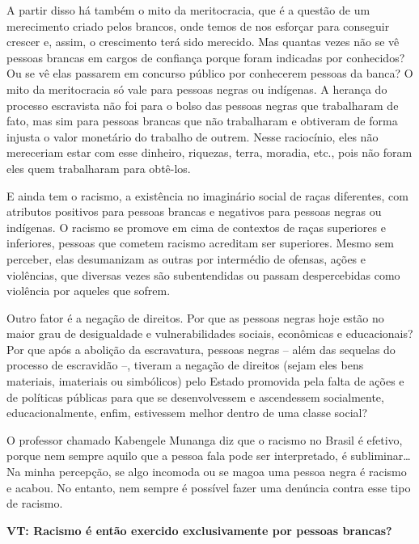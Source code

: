 \documentclass[a4paper,
fontsize=11pt,
oneside,
numbers=noperiodatend,
parskip=half-,
bibliography=totoc,
final
]{scrartcl}
\begin{document}
A partir disso há também o mito da meritocracia, que é a questão de um
merecimento criado pelos brancos, onde temos de nos esforçar para
conseguir crescer e, assim, o crescimento terá sido merecido. Mas
quantas vezes não se vê pessoas brancas em cargos de confiança porque
foram indicadas por conhecidos? Ou se vê elas passarem em concurso
público por conhecerem pessoas da banca? O mito da meritocracia só vale
para pessoas negras ou indígenas. A herança do processo escravista não
foi para o bolso das pessoas negras que trabalharam de fato, mas sim
para pessoas brancas que não trabalharam e obtiveram de forma injusta o
valor monetário do trabalho de outrem. Nesse raciocínio, eles não
mereceriam estar com esse dinheiro, riquezas, terra, moradia, etc., pois
não foram eles quem trabalharam para obtê-los.

E ainda tem o racismo, a existência no imaginário social de raças
diferentes, com atributos positivos para pessoas brancas e negativos
para pessoas negras ou indígenas. O racismo se promove em cima de
contextos de raças superiores e inferiores, pessoas que cometem racismo
acreditam ser superiores. Mesmo sem perceber, elas desumanizam as outras
por intermédio de ofensas, ações e violências, que diversas vezes são
subentendidas ou passam despercebidas como violência por aqueles que
sofrem.

Outro fator é a negação de direitos. Por que as pessoas negras hoje
estão no maior grau de desigualdade e vulnerabilidades sociais,
econômicas e educacionais? Por que após a abolição da escravatura,
pessoas negras -- além das sequelas do processo de escravidão --,
tiveram a negação de direitos (sejam eles bens materiais, imateriais ou
simbólicos) pelo Estado promovida pela falta de ações e de políticas
públicas para que se desenvolvessem e ascendessem socialmente,
educacionalmente, enfim, estivessem melhor dentro de uma classe social?

O professor chamado Kabengele Munanga diz que o racismo no Brasil é
efetivo, porque nem sempre aquilo que a pessoa fala pode ser
interpretado, é subliminar\ldots{} Na minha percepção, se algo incomoda
ou se magoa uma pessoa negra é racismo e acabou. No entanto, nem sempre
é possível fazer uma denúncia contra esse tipo de racismo.

\textbf{VT: Racismo é então exercido exclusivamente por pessoas
brancas?}
\end{document}
